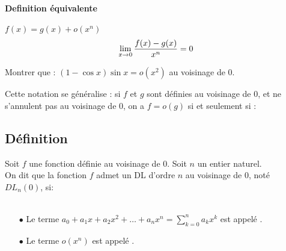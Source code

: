 \documentclass[a4paper, 11pt]{article}
\begin{document}
\paragraph{Definition équivalente} \phantom{}$f(x)=g(x)+o(x^n)$
 $$\lim_{x\rightarrow 0} \frac{f(x)-g(x)}{x^n}=0$$
\begin{exemple}
Montrer que : $ (1-\cos x) \sin x = o(x^2)$ au voisinage de $0$.



\begin{rem}
Cette notation se g\'en\'eralise : si $f$ et $g$ sont d\'efinies au voisinage de 0, et ne s'annulent pas au voisinage de $0$, on a $f=o(g)$ si et seulement si : \dotfill \vsec\\
\end{rem}



\end{exemple}

\subsection{D\'efinition}









\vspace{0.4cm}

 {\noindent  

\begin{defi} 
Soit $f$ une fonction d\'efinie au voisinage de 0. Soit $n$ un entier naturel.\\
\noindent On dit que la fonction $f$ admet un DL d'ordre $n$ au voisinage de 0, not\'e $DL_n(0)$, si:\vsec\\
\phantom{ } \dotfill\vsec\\
\phantom{ } \dotfill \vsec
\begin{itemize}
\item[$\bullet$] Le terme $a_0+a_1 x+a_2x^2+\dots +a_nx^n=\sum\limits_{k=0}^n a_k x^k$ est appel\'e \dotfill.
\item[$\bullet$]  Le terme $o(x^n)$ est appel\'e \dotfill.\vsec
\end{itemize}
\end{defi}
 
}
\end{document}

